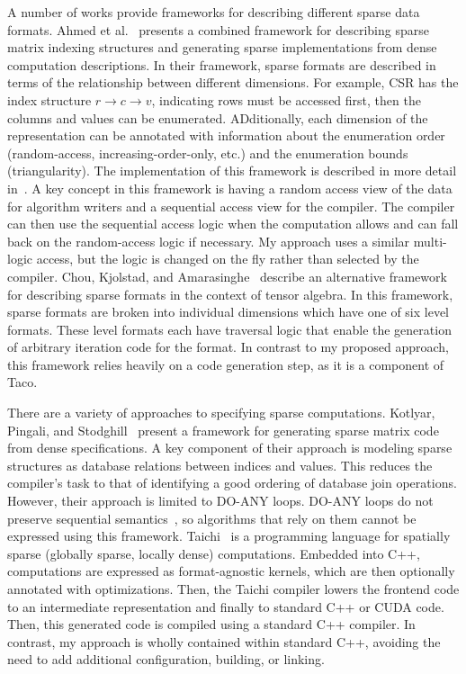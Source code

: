 \documentclass{article}
\begin{document}
A number of works provide frameworks for describing different sparse data formats. 
Ahmed et al.~\cite{ahmed2000framework} presents a combined framework for describing sparse matrix indexing structures and generating sparse implementations from dense computation descriptions.
In their framework, sparse formats are described in terms of the relationship between different dimensions. For example, CSR has the index structure $r \rightarrow c \rightarrow v$, indicating rows must be accessed first, then the columns and values can be enumerated.
ADditionally, each dimension of the representation can be annotated with information about the enumeration order (random-access, increasing-order-only, etc.) and the enumeration bounds (triangularity).
The implementation of this framework is described in more detail in~\cite{mateev2000next}.
A key concept in this framework is having a random access view of the data for algorithm writers and a sequential access view for the compiler.
The compiler can then use the sequential access logic when the computation allows and can fall back on the random-access logic if necessary. 
My approach uses a similar multi-logic access, but the logic is changed on the fly rather than selected by the compiler.
Chou, Kjolstad, and Amarasinghe~\cite{chou2018format} describe an alternative framework for describing sparse formats in the context of tensor algebra. 
In this framework, sparse formats are broken into individual dimensions which have one of six level formats. 
These level formats each have traversal logic that enable the generation of arbitrary iteration code for the format.
In contrast to my proposed approach, this framework relies heavily on a code generation step, as it is a component of Taco.

There are a variety of approaches to specifying sparse computations.
Kotlyar, Pingali, and Stodghill~\cite{kotlyar1997relational} present a framework for generating sparse matrix code from dense specifications.
A key component of their approach is modeling sparse structures as database relations between indices and values. 
This reduces the compiler's task to that of identifying a good ordering of database join operations.
However, their approach is limited to DO-ANY loops.
DO-ANY loops do not preserve sequential semantics~\cite{wolfe1992doany}, so algorithms that rely on them cannot be expressed using this framework.
Taichi~\cite{hu2019taichi} is a programming language for spatially sparse (globally sparse, locally dense) computations.
Embedded into C++, computations are expressed as format-agnostic kernels, which are then optionally annotated with optimizations.
Then, the Taichi compiler lowers the frontend code to an intermediate representation and finally to standard C++ or CUDA code. 
Then, this generated code is compiled using a standard C++ compiler.
In contrast, my approach is wholly contained within standard C++, avoiding the need to add additional configuration, building, or linking.
\end{document}
